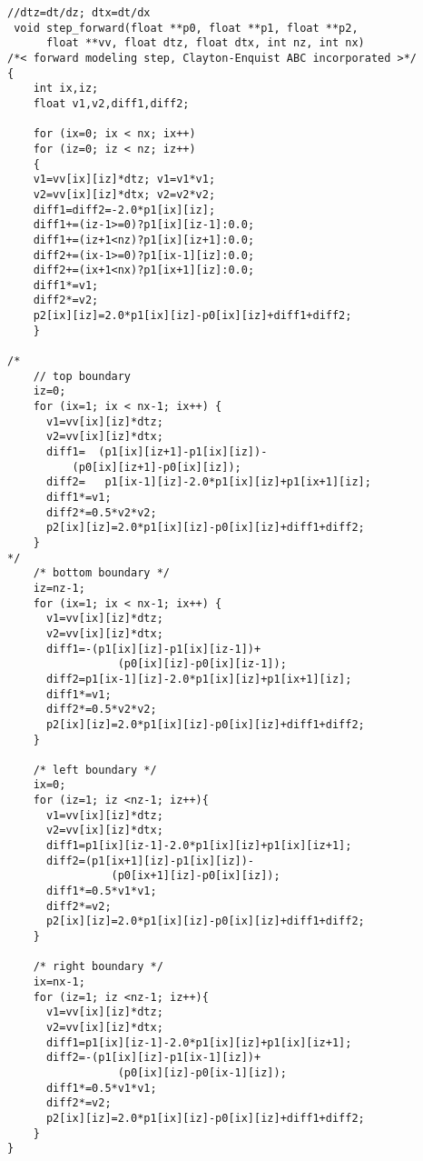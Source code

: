 \begin{lstlisting}
//dtz=dt/dz; dtx=dt/dx
 void step_forward(float **p0, float **p1, float **p2, 
      float **vv, float dtz, float dtx, int nz, int nx)
/*< forward modeling step, Clayton-Enquist ABC incorporated >*/
{
    int ix,iz;
    float v1,v2,diff1,diff2;

    for (ix=0; ix < nx; ix++) 
    for (iz=0; iz < nz; iz++) 
    {
    v1=vv[ix][iz]*dtz; v1=v1*v1;
    v2=vv[ix][iz]*dtx; v2=v2*v2;
    diff1=diff2=-2.0*p1[ix][iz];
    diff1+=(iz-1>=0)?p1[ix][iz-1]:0.0;
    diff1+=(iz+1<nz)?p1[ix][iz+1]:0.0;
    diff2+=(ix-1>=0)?p1[ix-1][iz]:0.0;
    diff2+=(ix+1<nx)?p1[ix+1][iz]:0.0;
    diff1*=v1;
    diff2*=v2;
    p2[ix][iz]=2.0*p1[ix][iz]-p0[ix][iz]+diff1+diff2;
    }

/*
    // top boundary 
    iz=0;
    for (ix=1; ix < nx-1; ix++) { 
	  v1=vv[ix][iz]*dtz; 
	  v2=vv[ix][iz]*dtx;
	  diff1=  (p1[ix][iz+1]-p1[ix][iz])-
		  (p0[ix][iz+1]-p0[ix][iz]);
	  diff2=   p1[ix-1][iz]-2.0*p1[ix][iz]+p1[ix+1][iz];
	  diff1*=v1;
	  diff2*=0.5*v2*v2;
	  p2[ix][iz]=2.0*p1[ix][iz]-p0[ix][iz]+diff1+diff2;
    }
*/
    /* bottom boundary */
    iz=nz-1;
    for (ix=1; ix < nx-1; ix++) { 
	  v1=vv[ix][iz]*dtz; 
	  v2=vv[ix][iz]*dtx;
	  diff1=-(p1[ix][iz]-p1[ix][iz-1])+
                 (p0[ix][iz]-p0[ix][iz-1]);
	  diff2=p1[ix-1][iz]-2.0*p1[ix][iz]+p1[ix+1][iz];
	  diff1*=v1;
	  diff2*=0.5*v2*v2;
	  p2[ix][iz]=2.0*p1[ix][iz]-p0[ix][iz]+diff1+diff2;
    }

    /* left boundary */
    ix=0;
    for (iz=1; iz <nz-1; iz++){ 
	  v1=vv[ix][iz]*dtz; 
	  v2=vv[ix][iz]*dtx;
	  diff1=p1[ix][iz-1]-2.0*p1[ix][iz]+p1[ix][iz+1];
	  diff2=(p1[ix+1][iz]-p1[ix][iz])-
                (p0[ix+1][iz]-p0[ix][iz]);
	  diff1*=0.5*v1*v1;
	  diff2*=v2;
	  p2[ix][iz]=2.0*p1[ix][iz]-p0[ix][iz]+diff1+diff2;
    }

    /* right boundary */
    ix=nx-1;
    for (iz=1; iz <nz-1; iz++){ 
	  v1=vv[ix][iz]*dtz; 
	  v2=vv[ix][iz]*dtx;
	  diff1=p1[ix][iz-1]-2.0*p1[ix][iz]+p1[ix][iz+1];
	  diff2=-(p1[ix][iz]-p1[ix-1][iz])+
                 (p0[ix][iz]-p0[ix-1][iz]);
	  diff1*=0.5*v1*v1;
	  diff2*=v2;
	  p2[ix][iz]=2.0*p1[ix][iz]-p0[ix][iz]+diff1+diff2;
    }  
}
\end{lstlisting}

